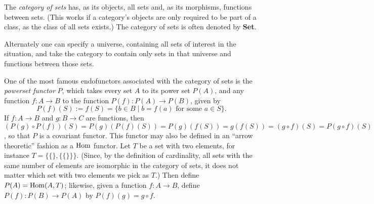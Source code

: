 \documentclass[12pt]{article}
\begin{document}
The {\em category of sets} has, as its objects, all sets and, 
as its morphisms, functions between sets.  (This works if a 
category's objects are only required to be part of a class, 
as the class of all sets exists.)  The category of sets is often denoted by \textbf{Set}.

Alternately one can specify a universe, containing all sets 
of interest in the situation, and take the category to contain 
only sets in that universe and functions between those sets.

One of the most famous endofunctors associated with the category of sets 
is the \emph{powerset functor} $P$, which takes every set $A$ to its 
power set $P(A)$, and any function $f:A\to B$ to the function 
$P(f): P(A)\to P(B)$, given by 
\[
 P(f)(S) := f(S) = \lbrace b\in B\mid b = 
 f(a)\mbox{ for some }a\in S\rbrace.
\]
If $f \colon A\to B$ and $g \colon B\to C$ are functions, then $(P(g)\circ P(f))(S) = 
P(g)(P(f)(S)) = P(g)(f(S))=g(f(S))= (g\circ f)(S)=P(g\circ f)(S)$, 
so that $P$ is a covariant functor.  This functor may also be defined
in an ``arrow theoretic'' fashion as a ${\rm Hom}$ functor.  Let $T$
be a set with two elements, for instance $T = \{ \{\}, \{\{\}\}\}$.
(Since, by the definition of cardinality, all sets with the same 
number of elements are isomorphic in the category of sets, it does
not matter which set with two elements we pick as $T$.) 
Then define $P(A) = {\rm Hom} (A,T)$; likewise, given a function
$f \colon A \to B$, define $P(f) \colon P(B) \to P(A)$ by
$P(f)(g) = g \circ f$.
\end{document}
